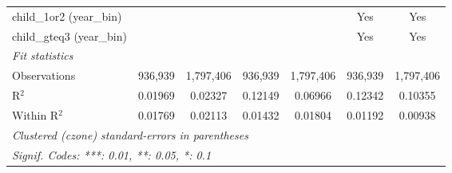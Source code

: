 \begin{tabular}{lcccccc}
child\_1or2 (year\_bin) &  &  &  &  & Yes & Yes\\
child\_gteq3 (year\_bin) &  &  &  &  & Yes & Yes\\
\midrule \emph{Fit statistics}&  & & & & & \\
Observations & 936,939&1,797,406&936,939&1,797,406&936,939&1,797,406\\
R$^2$ & 0.01969&0.02327&0.12149&0.06966&0.12342&0.10355\\
Within R$^2$ & 0.01769&0.02113&0.01432&0.01804&0.01192&0.00938\\
\midrule\midrule\multicolumn{7}{l}{\emph{Clustered (czone) standard-errors in parentheses}}\\
\multicolumn{7}{l}{\emph{Signif. Codes: ***: 0.01, **: 0.05, *: 0.1}}\\
\end{tabular}


